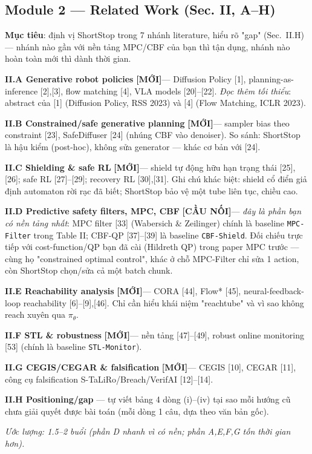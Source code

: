 \documentclass[a4paper,12pt]{article}
\newcommand{\new}{\textcolor{red!60!black}{\textbf{[MỚI]}}}
\newcommand{\bridge}{\textcolor{blue!50!black}{\textbf{[CẦU NỐI]}}}
\begin{document}
\subsection{Module 2 --- Related Work (Sec. II, A--H)}
\textbf{Mục tiêu}: định vị ShortStop trong 7 nhánh literature, hiểu rõ "gap" (Sec.~II.H) — nhánh nào gần với nền tảng MPC/CBF của bạn thì tận dụng, nhánh nào hoàn toàn mới thì dành thời gian.

\begin{tasklist}
  \item[\square] \textbf{II.A Generative robot policies} \new — Diffusion Policy [1], planning-as-inference [2],[3], flow matching [4], VLA models [20]--[22]. \emph{Đọc thêm tối thiểu}: abstract của [1] (Diffusion Policy, RSS 2023) và [4] (Flow Matching, ICLR 2023).
  \item[\square] \textbf{II.B Constrained/safe generative planning} \new — sampler bias theo constraint [23], SafeDiffuser [24] (nhúng CBF vào denoiser). So sánh: ShortStop là hậu kiểm (post-hoc), không sửa generator — khác cơ bản với [24].
  \item[\square] \textbf{II.C Shielding \& safe RL} \new — shield tự động hữu hạn trạng thái [25],[26]; safe RL [27]--[29]; recovery RL [30],[31]. Ghi chú khác biệt: shield cổ điển giả định automaton rời rạc đã biết; ShortStop bảo vệ một tube liên tục, chiều cao.
  \item[\square] \textbf{II.D Predictive safety filters, MPC, CBF} \bridge — \emph{đây là phần bạn có nền tảng nhất}: MPC filter [33] (Wabersich \& Zeilinger) chính là baseline \texttt{MPC-Filter} trong Table II; CBF-QP [37]--[39] là baseline \texttt{CBF-Shield}. Đối chiếu trực tiếp với cost-function/QP bạn đã cài (Hildreth QP) trong paper MPC trước — cùng họ "constrained optimal control", khác ở chỗ MPC-Filter chỉ sửa 1 action, còn ShortStop chọn/sửa cả một batch chunk.
  \item[\square] \textbf{II.E Reachability analysis} \new — CORA [44], Flow* [45], neural-feedback-loop reachability [6]--[9],[46]. Chỉ cần hiểu khái niệm "reachtube" và vì sao không reach xuyên qua $\pi_\theta$.
  \item[\square] \textbf{II.F STL \& robustness} \new — nền tảng [47]--[49], robust online monitoring [53] (chính là baseline \texttt{STL-Monitor}).
  \item[\square] \textbf{II.G CEGIS/CEGAR \& falsification} \new — CEGIS [10], CEGAR [11], công cụ falsification S-TaLiRo/Breach/VerifAI [12]--[14].
  \item[\square] \textbf{II.H Positioning/gap} — tự viết bảng 4 dòng (i)--(iv) tại sao mỗi hướng cũ chưa giải quyết được bài toán (mỗi dòng 1 câu, dựa theo văn bản gốc).
\end{tasklist}
\textit{Ước lượng: 1.5--2 buổi (phần D nhanh vì có nền; phần A,E,F,G tốn thời gian hơn).}
\end{document}
